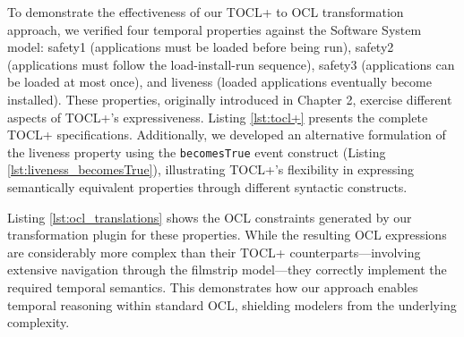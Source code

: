\hspace{1cm} To demonstrate the effectiveness of our TOCL+ to OCL transformation approach, we verified four temporal 
properties against the Software System model: safety1 (applications must be loaded before being run), 
safety2 (applications must follow the load-install-run sequence), safety3 (applications can be loaded at most once), 
and liveness (loaded applications eventually become installed). These properties, originally introduced in Chapter 2, 
exercise different aspects of TOCL+'s expressiveness. Listing \ref{lst:tocl+} presents the complete TOCL+ 
specifications. Additionally, we developed an alternative formulation of the liveness property using the 
\texttt{becomesTrue} event construct (Listing \ref{lst:liveness_becomesTrue}), illustrating TOCL+'s 
flexibility in expressing semantically equivalent properties through different syntactic constructs.

Listing \ref{lst:ocl_translations} shows 
the OCL constraints generated by our transformation plugin for these properties. 
While the resulting OCL expressions are considerably more complex than their TOCL+ 
counterparts—involving extensive navigation through the filmstrip model—they 
correctly implement the required temporal semantics. This demonstrates how our 
approach enables temporal reasoning within standard OCL, shielding modelers 
from the underlying complexity.

